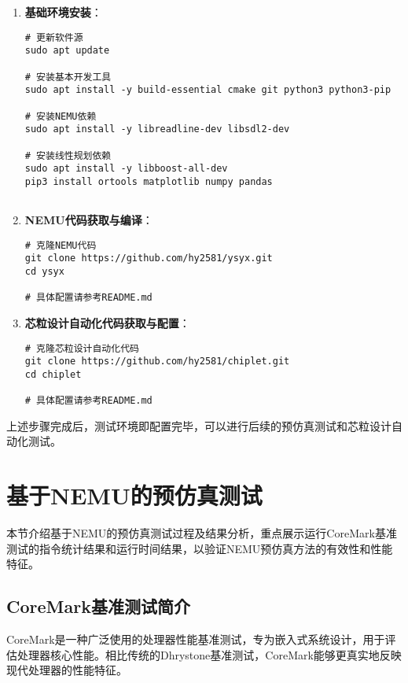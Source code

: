 \documentclass[bachelor]{thesis-uestc}
\begin{document}
\begin{enumerate}
    \item \textbf{基础环境安装}：
    
    \begin{verbatim}
# 更新软件源
sudo apt update

# 安装基本开发工具
sudo apt install -y build-essential cmake git python3 python3-pip

# 安装NEMU依赖
sudo apt install -y libreadline-dev libsdl2-dev

# 安装线性规划依赖
sudo apt install -y libboost-all-dev
pip3 install ortools matplotlib numpy pandas


    \end{verbatim}

    \item \textbf{NEMU代码获取与编译}：
    
    \begin{verbatim}
# 克隆NEMU代码
git clone https://github.com/hy2581/ysyx.git
cd ysyx

# 具体配置请参考README.md
    \end{verbatim}

    \item \textbf{芯粒设计自动化代码获取与配置}：
    
    \begin{verbatim}
# 克隆芯粒设计自动化代码
git clone https://github.com/hy2581/chiplet.git
cd chiplet

# 具体配置请参考README.md
    \end{verbatim}
\end{enumerate}

上述步骤完成后，测试环境即配置完毕，可以进行后续的预仿真测试和芯粒设计自动化测试。

\section{基于NEMU的预仿真测试}

本节介绍基于NEMU的预仿真测试过程及结果分析，重点展示运行CoreMark基准测试的指令统计结果和运行时间结果，以验证NEMU预仿真方法的有效性和性能特征。

\subsection{CoreMark基准测试简介}

CoreMark是一种广泛使用的处理器性能基准测试，专为嵌入式系统设计，用于评估处理器核心性能。相比传统的Dhrystone基准测试，CoreMark能够更真实地反映现代处理器的性能特征。
\end{document}

